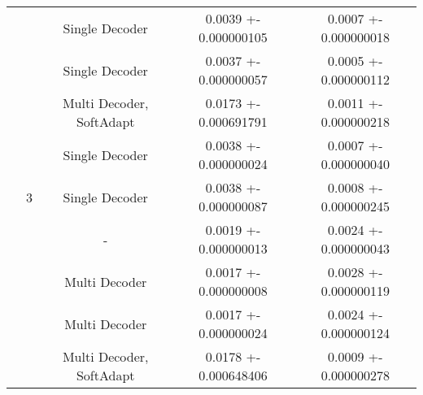 \begin{center}
\begin{tabular}{||c|c|c|c|c||}
    \cline{2-5}
     & \multirow{9}{*}{3} & Single Decoder & 0.0039 +- 0.000000105 & 0.0007 +- 0.000000018 \\
    \cline{3-5}
     &  & Single Decoder & 0.0037 +- 0.000000057 & 0.0005 +- 0.000000112 \\
    \cline{3-5}
     &  & Multi Decoder, SoftAdapt & 0.0173 +- 0.000691791 & 0.0011 +- 0.000000218 \\
    \cline{3-5}
     &  & Single Decoder & 0.0038 +- 0.000000024 & 0.0007 +- 0.000000040 \\
    \cline{3-5}
     &  & Single Decoder & 0.0038 +- 0.000000087 & 0.0008 +- 0.000000245 \\
    \cline{3-5}
     &  & - & 0.0019 +- 0.000000013 & 0.0024 +- 0.000000043 \\
    \cline{3-5}
     &  & Multi Decoder & 0.0017 +- 0.000000008 & 0.0028 +- 0.000000119 \\
    \cline{3-5}
     &  & Multi Decoder & 0.0017 +- 0.000000024 & 0.0024 +- 0.000000124 \\
    \cline{3-5}
     &  & Multi Decoder, SoftAdapt & 0.0178 +- 0.000648406 & 0.0009 +- 0.000000278 \\
    \cline{2-5}
    \hline
    \end{tabular}
\end{center}